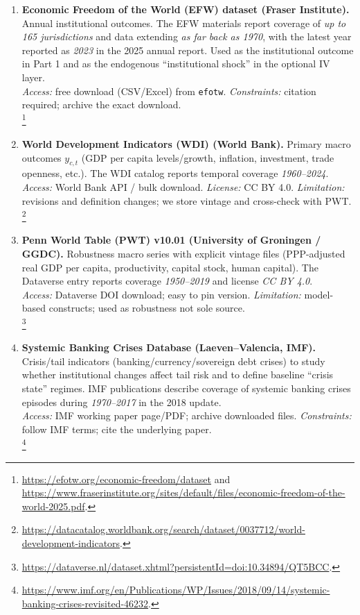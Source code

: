 \documentclass[11pt]{article}
\newcommand{\IV}{\mathrm{IV}}
\newcommand{\1}{\mathbf{1}}
\newcommand{\cid}{c}
\begin{document}
\begin{enumerate}[leftmargin=1.2em]
\item \textbf{Economic Freedom of the World (EFW) dataset (Fraser Institute).} Annual institutional outcomes. The EFW materials report coverage of \emph{up to 165 jurisdictions} and data extending \emph{as far back as 1970}, with the latest year reported as \emph{2023} in the 2025 annual report. Used as the institutional outcome in Part 1 and as the endogenous ``institutional shock'' in the optional $\IV$ layer.\\
\emph{Access:} free download (CSV/Excel) from \texttt{efotw}. \emph{Constraints:} citation required; archive the exact download.\\
\footnote{\url{https://efotw.org/economic-freedom/dataset} and \url{https://www.fraserinstitute.org/sites/default/files/economic-freedom-of-the-world-2025.pdf}.}
\item \textbf{World Development Indicators (WDI) (World Bank).} Primary macro outcomes $y_{\cid,t}$ (GDP per capita levels/growth, inflation, investment, trade openness, etc.). The WDI catalog reports temporal coverage \emph{1960--2024}.\\
\emph{Access:} World Bank API / bulk download. \emph{License:} CC BY 4.0. \emph{Limitation:} revisions and definition changes; we store vintage and cross-check with PWT.\\
\footnote{\url{https://datacatalog.worldbank.org/search/dataset/0037712/world-development-indicators}.}
\item \textbf{Penn World Table (PWT) v10.01 (University of Groningen / GGDC).} Robustness macro series with explicit vintage files (PPP-adjusted real GDP per capita, productivity, capital stock, human capital). The Dataverse entry reports coverage \emph{1950--2019} and license \emph{CC BY 4.0}.\\
\emph{Access:} Dataverse DOI download; easy to pin version. \emph{Limitation:} model-based constructs; used as robustness not sole source.\\
\footnote{\url{https://dataverse.nl/dataset.xhtml?persistentId=doi:10.34894/QT5BCC}.}
\item \textbf{Systemic Banking Crises Database (Laeven--Valencia, IMF).} Crisis/tail indicators (banking/currency/sovereign debt crises) to study whether institutional changes affect tail risk and to define baseline ``crisis state'' regimes. IMF publications describe coverage of systemic banking crises episodes during \emph{1970--2017} in the 2018 update.\\
\emph{Access:} IMF working paper page/PDF; archive downloaded files. \emph{Constraints:} follow IMF terms; cite the underlying paper.\\
\footnote{\url{https://www.imf.org/en/Publications/WP/Issues/2018/09/14/systemic-banking-crises-revisited-46232}.}
\end{enumerate}
\end{document}
